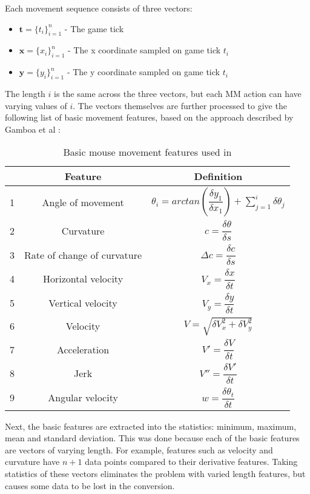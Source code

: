 \documentclass[Report.tex]{subfiles}
\begin{document}
Each movement sequence consists of three vectors:
\begin{itemize}
\item $\boldsymbol{t} = \{t_i\}^{n}_{i=1}$ - The game tick
\item $\boldsymbol{x} = \{x_i\}^{n}_{i=1}$ - The x coordinate sampled on game tick $t_i$
\item $\boldsymbol{y} = \{y_i\}^{n}_{i=1}$ - The y coordinate sampled on game tick $t_i$
\end{itemize}
The length $i$ is the same across the three vectors, but each MM action can have varying values of $i$. The vectors themselves are further processed to give the following list of basic movement features, based on the approach described by Gamboa et al \cite{mouse-features}:
\begin{table}[H]
\renewcommand*{\arraystretch}{2.5}
\centering
\begin{tabular}{| c | c | c |}
\hline
& \textbf{Feature} & \textbf{Definition} \\ \hline
1 & Angle of movement & $\theta_i = arctan(\dfrac{\delta y_1}{\delta x_1}) + \sum\limits_{j=1}^{i} \delta \theta_j$ \\ \hline
2 & Curvature & $c = \dfrac{\delta\theta}{\delta s}$ \\ \hline
3 & Rate of change of curvature & $\Delta c = \dfrac{\delta c}{\delta s}$ \\ \hline
4 & Horizontal velocity & $V_x = \dfrac{\delta x}{\delta t}$ \\ \hline
5 & Vertical velocity & $V_y = \dfrac{\delta y}{\delta t}$ \\ \hline
6 & Velocity & $V = \sqrt{\delta V_{x}^{2} + \delta V_{y}^{2}}$ \\ \hline
7 & Acceleration & $V' = \dfrac{\delta V}{\delta t}$ \\ \hline
8 & Jerk & $V'' = \dfrac{\delta V'}{\delta t}$ \\ \hline
9 & Angular velocity & $w = \dfrac{\delta \theta_t}{\delta t}$ \\ \hline
\end{tabular}
\caption{Basic mouse movement features used in \cite{mouse-features}}
\label{tbl:mm-features}
\end{table}

Next, the basic features are extracted into the statistics: minimum, maximum, mean and standard deviation. This was done because each of the basic features are vectors of varying length. For example, features such as velocity and curvature have $n + 1$ data points compared to their derivative features. Taking statistics of these vectors eliminates the problem with varied length features, but causes some data to be lost in the conversion.
\end{document}

